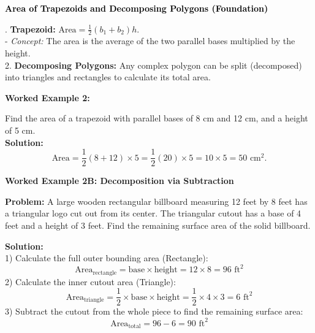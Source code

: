 \documentclass[12pt, letterpaper, fleqn]{article}
\begin{document}
\begin{tcolorbox}[colback=black!10]
    \large\textcolor{black}{\textbf{Area of Trapezoids and Decomposing Polygons (Foundation)}}
\end{tcolorbox}

\vspace{3mm}

. \textbf{Trapezoid:} $\text{Area} = \frac{1}{2}(b_1 + b_2)h$. \\
- \textit{Concept:} The area is the average of the two parallel bases multiplied by the height. \\
2. \textbf{Decomposing Polygons:} Any complex polygon can be split (decomposed) into triangles and rectangles to calculate its total area.

\vspace{4mm}

\begin{tcolorbox}[colback=white, colframe=black!25, boxrule=0.6pt, arc=4mm, left=6mm, right=6mm, top=5mm, bottom=5mm]
\textbf{Worked Example 2:}

\medskip
\noindent
Find the area of a trapezoid with parallel bases of 8 cm and 12 cm, and a height of 5 cm.\\
\textbf{Solution:} \\
$$\text{Area} = \frac{1}{2}(8 + 12) \times 5 = \frac{1}{2}(20) \times 5 = 10 \times 5 = 50\text{ cm}^2.$$
\end{tcolorbox}

\vspace{4mm}

\begin{tcolorbox}[colback=white, colframe=black!25, boxrule=0.6pt, arc=4mm, left=6mm, right=6mm, top=5mm, bottom=5mm]
\textbf{Worked Example 2B: Decomposition via Subtraction}

\medskip
\noindent
\textbf{Problem:} A large wooden rectangular billboard measuring 12 feet by 8 feet has a triangular logo cut out from its center. The triangular cutout has a base of 4 feet and a height of 3 feet. Find the remaining surface area of the solid billboard.

\medskip
\noindent
\textbf{Solution:} \\
1) Calculate the full outer bounding area (Rectangle):
$$\text{Area}_{\text{rectangle}} = \text{base} \times \text{height} = 12 \times 8 = 96\text{ ft}^2$$
2) Calculate the inner cutout area (Triangle):
$$\text{Area}_{\text{triangle}} = \frac{1}{2} \times \text{base} \times \text{height} = \frac{1}{2} \times 4 \times 3 = 6\text{ ft}^2$$
3) Subtract the cutout from the whole piece to find the remaining surface area:
$$\text{Area}_{\text{total}} = 96 - 6 = 90\text{ ft}^2$$
\end{tcolorbox}
\vspace{4mm}
\end{document}
